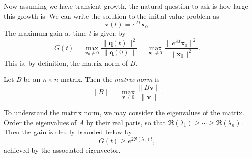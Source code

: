 \documentclass[a4paper]{article}
\begin{document}
%
%

Now assuming we have transient growth, the natural question to ask is how large this growth is. We can write the solution to the initial value problem as
\[
  \mathbf{x}(t) = e^{At} \mathbf{x}_0.
\]
The maximum gain at time $t$ is given by
\[
  G(t) = \max_{\mathbf{x}_0 \not= 0} \frac{\|\mathbf{q}(t)\|^2}{\|\mathbf{q}(0)\|} = \max_{\mathbf{x}_0 \not= 0} \frac{\|e^{At} \mathbf{x}_0\|^2}{\|\mathbf{x}_0\|^2}.
\]
This is, by definition, the matrix norm of $B$.

\begin{defi}
  Let $B$ be an $n \times n$ matrix. Then the \emph{matrix norm} is
  \[
    \|B\| = \max_{\mathbf{v} \not= 0} \frac{\|B\mathbf{v}\|}{\|\mathbf{v}\|}.
  \]
\end{defi}

To understand the matrix norm, we may consider the eigenvalues of the matrix. Order the eigenvalues of $A$ by their real parts, so that $\Re(\lambda_1) \geq \cdots \geq \Re(\lambda_n)$. Then the gain is clearly bounded below by
\[
  G(t) \geq e^{2 \Re(\lambda_1)t},
\]
achieved by the associated eigenvector.
\end{document}
